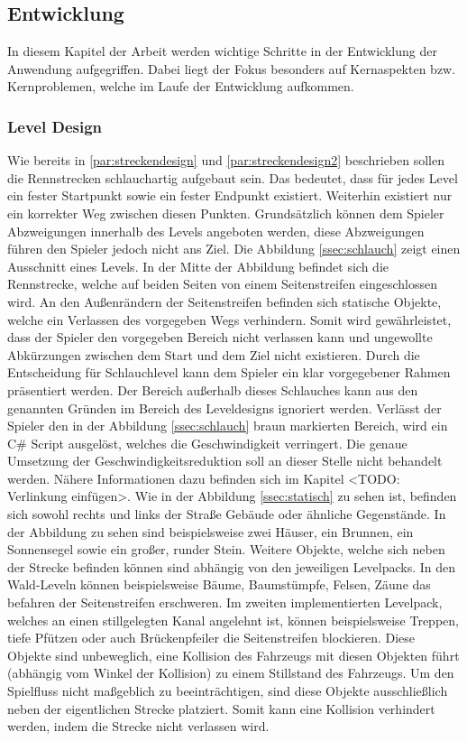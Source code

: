 \subsection{Entwicklung}
In diesem Kapitel der Arbeit werden wichtige Schritte in der Entwicklung der Anwendung aufgegriffen. Dabei liegt der Fokus besonders auf Kernaspekten bzw. Kernproblemen, welche im Laufe der Entwicklung aufkommen.
	\subsubsection{Level Design}
		Wie bereits in \ref{par:streckendesign} und \ref{par:streckendesign2} beschrieben sollen die Rennstrecken schlauchartig aufgebaut sein. Das bedeutet, dass für jedes Level ein fester Startpunkt sowie ein fester Endpunkt existiert. Weiterhin existiert nur ein korrekter Weg zwischen diesen Punkten. Grundsätzlich können dem Spieler Abzweigungen innerhalb des Levels angeboten werden, diese Abzweigungen führen den Spieler jedoch nicht ans Ziel. 
		Die Abbildung \ref{ssec:schlauch} zeigt einen Ausschnitt eines Levels. In der Mitte der Abbildung befindet sich die Rennstrecke, welche auf beiden Seiten von einem Seitenstreifen eingeschlossen wird. An den Außenrändern der Seitenstreifen befinden sich statische Objekte, welche ein Verlassen des vorgegeben Wegs verhindern. Somit wird gewährleistet, dass der Spieler den vorgegeben Bereich nicht verlassen kann und ungewollte Abkürzungen zwischen dem Start und dem Ziel nicht existieren. Durch die Entscheidung für Schlauchlevel kann dem Spieler ein klar vorgegebener Rahmen präsentiert werden. Der Bereich außerhalb dieses Schlauches kann aus den genannten Gründen im Bereich des Leveldesigns ignoriert werden. Verlässt der Spieler den in der Abbildung \ref{ssec:schlauch} braun markierten Bereich, wird ein C\# Script ausgelöst, welches die Geschwindigkeit verringert. Die genaue Umsetzung der Geschwindigkeitsreduktion soll an dieser Stelle nicht behandelt werden. Nähere Informationen dazu befinden sich im Kapitel <TODO: Verlinkung einfügen>.
		Wie in der Abbildung \ref{ssec:statisch} zu sehen ist, befinden sich sowohl rechts und links der Straße Gebäude oder ähnliche Gegenstände. In der Abbildung zu sehen sind beispielsweise zwei Häuser, ein Brunnen, ein Sonnensegel sowie ein großer, runder Stein. Weitere Objekte, welche sich neben der Strecke befinden können sind abhängig von den jeweiligen Levelpacks. In den Wald-Leveln können beispielsweise Bäume, Baumstümpfe, Felsen, Zäune das befahren der Seitenstreifen erschweren. Im zweiten implementierten Levelpack, welches an einen stillgelegten Kanal angelehnt ist, können beispielsweise Treppen, tiefe Pfützen oder auch Brückenpfeiler die Seitenstreifen blockieren. Diese Objekte sind unbeweglich, eine Kollision des Fahrzeugs mit diesen Objekten führt (abhängig vom Winkel der Kollision) zu einem Stillstand des Fahrzeugs. Um den Spielfluss nicht maßgeblich zu beeinträchtigen, sind diese Objekte ausschließlich neben der eigentlichen Strecke platziert. Somit kann eine Kollision verhindert werden, indem die Strecke nicht verlassen wird. 
